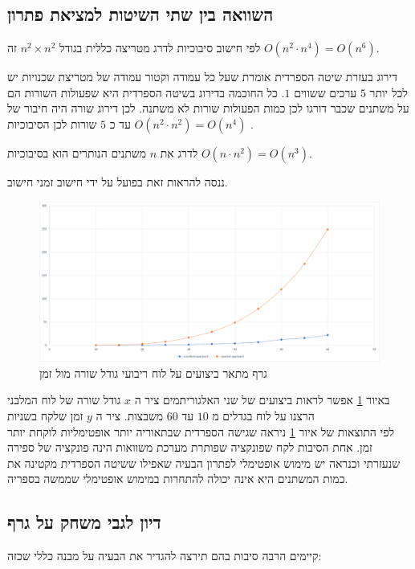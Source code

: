 \documentclass[12pt,leqno]{article}
\begin{document}
\subsection{השוואה בין שתי השיטות למציאת פתרון}
לפי חישוב סיבוכיות
לדרג מטריצה 
כללית
בגודל 
$n^2 \times n^2$
זה 
$O(n^2 \cdot n^4) = O(n^6)$.

דירוג בעזרת שיטה הספרדית אומרת
שעל כל עמודה 
וקטור עמודה 
של מטריצת שכנויות
יש לכל יותר
$5$
ערכים ששווים 
$1$.
כל החוכמה בדירוג בשיטה הספרדית היא 
שפעולות השורות הם על משתנים שכבר דורגו
לכן 
כמות הפעולות שורות לא משתנה.
לכן דירוג שורה היה חיבור 
של עד כ
$5$
שורות
לכן הסיבוכיות 
$O(n^2 \cdot n^2) = O(n^4)$
.

לדרג את
$n$
משתנים  
הנותרים
הוא בסיבוכיות 
$O(n \cdot n^2) = O (n^3)$.

ננסה להראות זאת בפועל על ידי חישוב זמני חישוב.

\begin{figure}[ht]
    \caption{ 
    גרף מתאר ביצועים על לוח ריבועי גודל שורה מול זמן
    }
    \label{fig:prefofmance_diagram}
    \centering
    \includegraphics[width=\textwidth,height=\textheight,keepaspectratio]{images/benchmark.png}
\end{figure}

באיור 
\ref{fig:prefofmance_diagram}
אפשר לראות ביצועים
של שני האלגוריתמים ציר 
ה
$x$
גודל שורה של לוח המלבני
הרצנו על 
לוח בגדלים 
מ
$10$
עד 
$60$
משבצות.
ציר ה
$y$
זמן שלקח 
בשניות
\\
לפי התוצאות של איור 
\ref{fig:prefofmance_diagram}
ניראה 
שגישה הספרדית שבתאוריה יותר אופטימליות לוקחת יותר זמן.
אחת הסיבות לקח 
שפונקציה שפותרת מערכת משוואות הינה פונקציה של ספירה שנעזרתי וכנראה יש מימוש אופטימלי לפתרון הבעיה שאפילו 
ששיטה הספרדית מקטינה את כמות 
המשתנים היא אינה יכולה להתחרות במימוש אופטימלי שממשה בספריה.

\subsection{דיון לגבי משחק על גרף}
קיימים הרבה סיבות בהם תירצה להגדיר את הבעיה על מבנה כללי שכזה:
\end{document}
